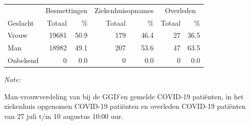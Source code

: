 \documentclass[
  english,
  man,floatsintext]{apa6}
\begin{document}
\begin{table}
\centering\begingroup\fontsize{11}{13}\selectfont

\begin{threeparttable}
\begin{tabular}{lrrrrrr}
\toprule
\multicolumn{1}{c}{ } & \multicolumn{2}{c}{Besmettingen} & \multicolumn{2}{c}{Ziekenhuisopnames} & \multicolumn{2}{c}{Overleden} \\
\cmidrule(l{3pt}r{3pt}){2-3} \cmidrule(l{3pt}r{3pt}){4-5} \cmidrule(l{3pt}r{3pt}){6-7}
Geslacht & Totaal & \% & Totaal & \% & Totaal & \%\\
\midrule
Vrouw & 19681 & 50.9 & 179 & 46.4 & 27 & 36.5\\
Man & 18982 & 49.1 & 207 & 53.6 & 47 & 63.5\\
Onbekend & 0 & 0.0 & 0 & 0.0 & 0 & 0.0\\
\bottomrule
\end{tabular}
\begin{tablenotes}
\item \textit{Note: } 
\item Man-vrouwverdeling van bij de GGD’en gemelde COVID-19 patiënten, in het ziekenhuis opgenomen COVID-19 patiënten en overleden COVID-19 patiënten van 27 juli t/m 10 augustus 10:00 uur.
\end{tablenotes}
\end{threeparttable}
\endgroup{}
\end{table}
\newpage
\end{document}
